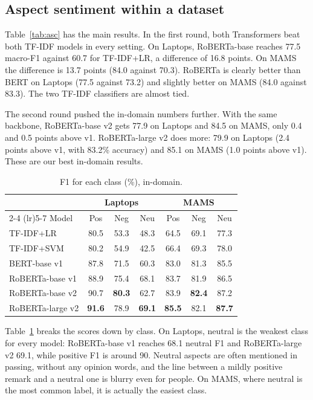 \documentclass[11pt]{article}
\begin{document}
\subsection{Aspect sentiment within a dataset}
Table~\ref{tab:asc} has the main results. In the first round, both Transformers beat both TF-IDF models in every setting. On Laptops, RoBERTa-base reaches 77.5 macro-F1 against 60.7 for TF-IDF+LR, a difference of 16.8 points. On MAMS the difference is 13.7 points (84.0 against 70.3). RoBERTa is clearly better than BERT on Laptops (77.5 against 73.2) and slightly better on MAMS (84.0 against 83.3). The two TF-IDF classifiers are almost tied.

The second round pushed the in-domain numbers further. With the same backbone, RoBERTa-base v2 gets 77.9 on Laptops and 84.5 on MAMS, only 0.4 and 0.5 points above v1. RoBERTa-large v2 does more: 79.9 on Laptops (2.4 points above v1, with 83.2\% accuracy) and 85.1 on MAMS (1.0 points above v1). These are our best in-domain results.

\begin{table}[t]
\centering
\footnotesize
\begin{tabular}{lcccccc}
\toprule
 & \multicolumn{3}{c}{Laptops} & \multicolumn{3}{c}{MAMS} \\
\cmidrule(lr){2-4} \cmidrule(lr){5-7}
Model & Pos & Neg & Neu & Pos & Neg & Neu \\
\midrule
TF-IDF+LR & 80.5 & 53.3 & 48.3 & 64.5 & 69.1 & 77.3 \\
TF-IDF+SVM & 80.2 & 54.9 & 42.5 & 66.4 & 69.3 & 78.0 \\
BERT-base v1 & 87.8 & 71.5 & 60.3 & 83.0 & 81.3 & 85.5 \\
RoBERTa-base v1 & 88.9 & 75.4 & 68.1 & 83.7 & 81.9 & 86.5 \\
RoBERTa-base v2 & 90.7 & \textbf{80.3} & 62.7 & 83.9 & \textbf{82.4} & 87.2 \\
RoBERTa-large v2 & \textbf{91.6} & 78.9 & \textbf{69.1} & \textbf{85.5} & 82.1 & \textbf{87.7} \\
\bottomrule
\end{tabular}
\caption{F1 for each class (\%), in-domain.}
\label{tab:perclass}
\end{table}

Table~\ref{tab:perclass} breaks the scores down by class. On Laptops, neutral is the weakest class for every model: RoBERTa-base v1 reaches 68.1 neutral F1 and RoBERTa-large v2 69.1, while positive F1 is around 90. Neutral aspects are often mentioned in passing, without any opinion words, and the line between a mildly positive remark and a neutral one is blurry even for people. On MAMS, where neutral is the most common label, it is actually the easiest class.
\end{document}

